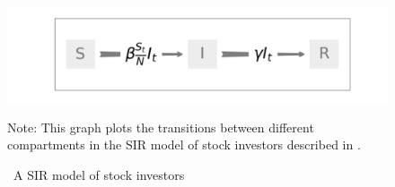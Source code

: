 	\begin{figure}[!ht] \centering  %
		\caption{ ~A SIR model of stock investors}
		\label{fig:sir_diagram}
		\centerline{\includegraphics[width=1.5\textwidth]{./figures/flow_diagram}}
		\begin{flushleft}
			{\footnotesize Note: This graph plots the transitions between different compartments in the SIR model of stock investors described in \cite{shiller1989survey}. }
		\end{flushleft}
	\end{figure}
